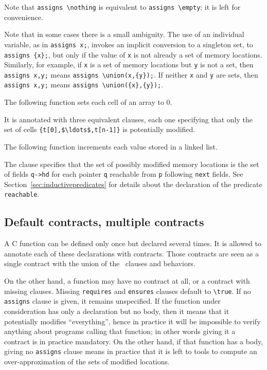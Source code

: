 Note that \lstinline|assigns \nothing| is equivalent to
\lstinline|assigns \empty|; it is left for convenience.

Note that in some cases there is a small ambiguity. The
use of an 
individual variable, as in \lstinline|assigns x;|, invokes an implicit conversion to a singleton set, to 
\lstinline|assigns {x};|, but only if the value of \lstinline|x| is not already a set of memory locations.
Similarly, for example, if \lstinline|x| is a set of memory locations but \lstinline|y| is not a set, then \lstinline|assigns x,y;| means
\lstinline|assigns \union(x,{y});|. If neither \lstinline|x| and \lstinline|y| are sets, then \lstinline|assigns x,y;| means
\lstinline|assigns \union({x},{y});|. 

\begin{example}
  The following function sets each cell of an array to 0.

%
  It is annotated with three equivalent \assigns{} clauses, each one
  specifying that only the set of cells
  \lstinline|{t[0],$\ldots$,t[n-1]}|
  is potentially modified.
\end{example}

\begin{example}
  \label{ex:locations-list}
  The following function increments each value stored in a linked
  list.

%
  The \assigns{} clause specifies that the set of possibly modified memory
  locations is the set of fields \lstinline|q->hd| for each pointer
  \lstinline|q|
  reachable from \lstinline|p| following \lstinline|next| fields. See
  Section~\ref{sec:inductivepredicates} for details about the
  declaration of the predicate \texttt{reachable}.
\end{example}

\subsection{Default contracts, multiple contracts}
\label{sec:multiplecontracts}

A C function can be defined only once but declared several times.
It is allowed to annotate each of these declarations with contracts.
Those contracts are seen as a single contract with the union of the
\requires\ clauses and behaviors.

On the other hand, a function may have no contract at all, or a
contract with missing clauses. Missing \lstinline|requires| and
\lstinline|ensures| clauses default to \lstinline!\true!.
If no \lstinline|assigns| clause is given, it remains unspecified. If the
function under consideration has only a declaration but no body, then
it means that it potentially modifies ``everything'', hence in practice
it will be impossible to verify anything about programs calling that
function; in other words giving it a contract is in practice
mandatory. On the other hand, if that function has a body, giving no
\lstinline|assigns| clause means in practice that it is left to tools to
compute an over-approximation of the sets of modified locations.

